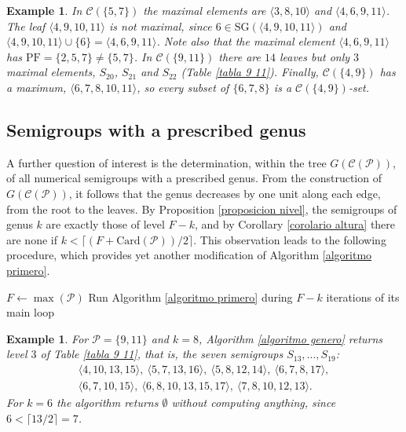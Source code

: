 \documentclass[11pt]{article}
\newtheorem{example}[theorem]{Example}
\numberwithin{equation}{section}
\newenvironment{algo}[2]{%
  \par\addvspace{\medskipamount}%
  \setcounter{algocf}{\value{theorem}}%
  \begin{algorithm}[H]\caption{#1}\label{#2}%
}{%
  \end{algorithm}%
  \setcounter{theorem}{\value{algocf}}%
  \par\addvspace{\medskipamount}}
\newcommand{\PF}{\mathrm{PF}}
\newcommand{\SG}{\mathrm{SG}}
\begin{document}
\begin{example}
In $\mathcal C(\{5,7\})$ the maximal elements are $\langle 3,8,10\rangle$ and $\langle 4,6,9,11\rangle$. The leaf $\langle 4,9,10,11\rangle$ is not maximal, since $6\in\SG(\langle 4,9,10,11\rangle)$ and $\langle 4,9,10,11\rangle\cup\{6\}=\langle 4,6,9,11\rangle$. Note also that the maximal element $\langle 4,6,9,11\rangle$ has $\PF=\{2,5,7\}\neq\{5,7\}$. In $\mathcal C(\{9,11\})$ there are $14$ leaves but only $3$ maximal elements, $S_{20}$, $S_{21}$ and $S_{22}$ (Table \ref{tabla 9 11}). Finally, $\mathcal C(\{4,9\})$ has a maximum, $\langle 6,7,8,10,11\rangle$, so every subset of $\{6,7,8\}$ is a $\mathcal C(\{4,9\})$-set.
\end{example}

\subsection{\texorpdfstring{Semigroups with a prescribed genus}{Semigroups with a prescribed genus}}\label{subsec:genus}

A further question of interest is the determination, within the tree $G(\mathcal{C}(\mathcal{P}))$, of all numerical semigroups with a prescribed genus. From the construction of $G(\mathcal{C}(\mathcal{P}))$, it follows that the genus decreases by one unit along each edge, from the root to the leaves. By Proposition \ref{proposicion nivel}, the semigroups of genus $k$ are exactly those of level $F-k$, and by Corollary \ref{corolario altura} there are none if $k<\lceil (F+\mathrm{Card}(\mathcal P))/2\rceil$. This observation leads to the following procedure, which provides yet another modification of Algorithm \ref{algoritmo primero}.

\begin{algo}{Computing the semigroups with fixed genus in $G(\mathcal C(\mathcal P))$}{algoritmo genero}
$F\gets\max(\mathcal P)$\;
Run Algorithm \ref{algoritmo primero} during $F-k$ iterations of its main loop\;
\;
\end{algo}

\begin{example}
For $\mathcal P=\{9,11\}$ and $k=8$, Algorithm \ref{algoritmo genero} returns level $3$ of Table \ref{tabla 9 11}, that is, the seven semigroups $S_{13},\ldots,S_{19}$:
\begin{gather*}
\langle 4,10,13,15\rangle,\ \langle 5,7,13,16\rangle,\ \langle 5,8,12,14\rangle,\ \langle 6,7,8,17\rangle,\\ \langle 6,7,10,15\rangle,\ \langle 6,8,10,13,15,17\rangle,\ \langle 7,8,10,12,13\rangle.
\end{gather*}
For $k=6$ the algorithm returns $\emptyset$ without computing anything, since $6<\lceil 13/2\rceil=7$.
\end{example}
\end{document}
